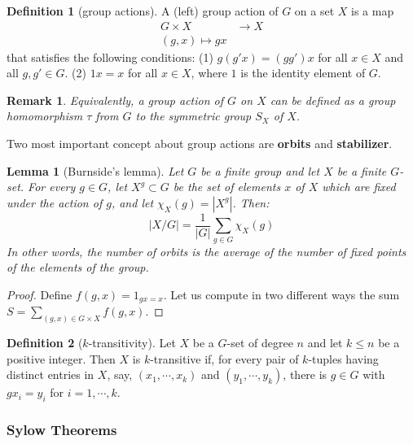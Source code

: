 \documentclass{article}
\newtheorem{Lem}{Lemma}[section]
\newtheorem*{Rk}{Remark}
\theoremstyle{definition}
\newtheorem{Def}{Definition}[section]
\begin{document}
\begin{Def}[group actions]
    A (left) group action of $G$ on a set $X$ is a map
    \begin{align*}
        G\times X&\to X\\
        (g,x)\mapsto gx
    \end{align*}
    that satisfies the following conditions:\newline
    (1) $g(g'x)=(gg')x$ for all $x\in X$ and all $g,g'\in G$.\newline
    (2) $1x=x$ for all $x\in X$, where $1$ is the identity element of $G$.
\end{Def}
\begin{Rk}
Equivalently, a group action of $G$ on $X$ can be defined as a group homomorphism $\tau$ from $G$ to the symmetric group $S_X$ of $X$.
\end{Rk}
Two most important concept about group actions are \textbf{orbits} and \textbf{stabilizer}.
\begin{Lem}[Burnside's lemma]
    Let $G$ be a finite group and let $X$ be a finite $G$-set. For every $g\in G$, let $X^g\subset G$ be the set of elements $x$ of $X$ which are fixed under the action of $g$, and let $\chi_X(g)=\left|X^g\right|$. Then:
    \[\left|X/G\right|=\frac{1}{\left|G\right|}\sum_{g\in G}\chi_X(g)\]
    In other words, the number of orbits is the average of the number of fixed points of the elements of the group.
\end{Lem}
\begin{proof}
    Define $f(g,x)=1_{gx=x}$. Let us compute in two different ways the sum $S=\sum_{(g,x)\in G\times X}f(g,x)$.
\end{proof}
\begin{Def}[$k$-transitivity]
Let $X$ be a $G$-set of degree $n$ and let $k\le n$ be a positive integer. Then $X$ is $k$-transitive if, for every pair of $k$-tuples having distinct entries in $X$,
say, $(x_1,\cdots,x_k)$ and $(y_1,\cdots,y_k)$, there is $g\in G$ with $gx_i=y_i$ for $i=1,\cdots,k$.
\end{Def}


\subsubsection{Sylow Theorems}
\end{document}
